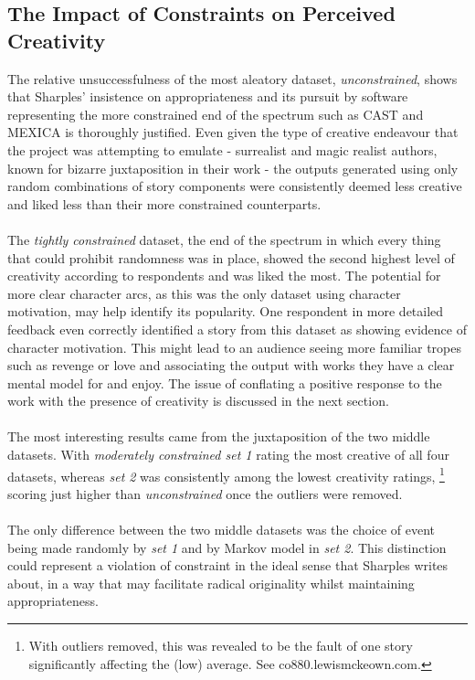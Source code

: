 \documentclass[letterpaper]{article}
\begin{document}
\subsection{The Impact of Constraints on Perceived Creativity}
The relative unsuccessfulness of the most aleatory dataset, \emph{unconstrained}, shows that Sharples' insistence on appropriateness and its pursuit by software representing the more constrained end of the spectrum such as CAST and MEXICA is thoroughly justified. Even given the type of creative endeavour that the project was attempting to emulate - surrealist and magic realist authors, known for bizarre juxtaposition in their work - the outputs generated using only random combinations of story components were consistently deemed less creative and liked less than their more constrained counterparts.\\ 
\\The \emph{tightly constrained} dataset, the end of the spectrum in which every thing that could prohibit randomness was in place, showed the second highest level of creativity according to respondents and was liked the most. The potential for more clear character arcs, as this was the only dataset using character motivation, may help identify its popularity. One respondent in more detailed feedback even correctly identified a story from this dataset as showing evidence of character motivation. This might lead to an audience seeing more familiar tropes such as revenge or love and associating the output with works they have a clear mental model for and enjoy. The issue of conflating a positive response to the work with the presence of creativity is discussed in the next section.\\
\\The most interesting results came from the juxtaposition of the two middle datasets. With \emph{moderately constrained set 1} rating the most creative of all four datasets, whereas \emph{set 2} was consistently among the lowest creativity ratings, \footnote{With outliers removed, this was revealed to be the fault of one story significantly affecting the (low) average. See co880.lewismckeown.com.} scoring just higher than \emph{unconstrained} once the outliers were removed.\\
\\The only difference between the two middle datasets was the choice of event being made randomly by \emph{set 1} and by Markov model in \emph{set 2}. This distinction could represent a violation of constraint in the ideal sense that Sharples writes about, in a way that may facilitate radical originality whilst maintaining appropriateness.\\
\end{document}
